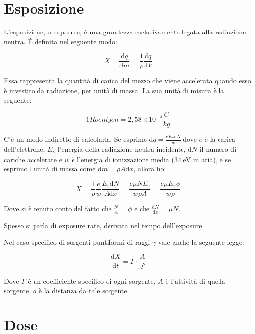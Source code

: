 \documentclass [a4paper, twoside] {book}
\begin{document}
\section{Esposizione}

L'esposizione, o exposure, è una grandezza esclusivamente legata alla radiazione neutra. \'E definita nel seguente modo:

\begin{equation}
X=\frac{\mathrm{d}q}{\mathrm{d}m}=\frac{1}{\rho}\frac{\mathrm{d}q}{\mathrm{d}V}
\end{equation}

Essa rappresenta la quantità di carica del mezzo che viene accelerata quando esso è investito da radiazione, per unità di massa. La sua unità di misura è la seguente:

\begin{equation}
1 Roentgen = 2,58 \times 10^{-4} \frac{C}{kg}
\end{equation}

C'è un modo indiretto di calcolarla. Se esprimo $\mathrm{d}q=\frac{eE_{\gamma}\mathrm{d}N }{w}$ dove $e$ è la carica dell'elettrone, $E_{\gamma}$ l'energia della radiazione neutra incidente, $\mathrm{d}N$ il numero di cariche accelerate e $w$ è l'energia di ionizzazione media (34 eV in aria), e se esprimo l'unità di massa come $\mathrm{d}m=\rho A \mathrm{d}x$, allora ho:

\begin{equation}
X=\frac{1}{\rho}\frac{e}{w}\frac{E_{\gamma}\mathrm{d}N}{A  \mathrm{d}x}=\frac{e  \mu  N E_{\gamma} }{ w  \rho A}=\frac{e \mu E_{\gamma} \phi}{w \rho}
\end{equation}

Dove si è tenuto conto del fatto che $\frac{N}{A}=\phi$ e che $\frac{\mathrm{d}N}{\mathrm{d}x}=\mu N$.

Spesso si parla di exposure rate, derivata nel tempo dell'exposure.

Nel caso specifico di sorgenti puntiformi di raggi $\gamma$ vale anche la seguente legge:

\begin{equation}
\frac{\mathrm{d}X}{\mathrm{d}t}=\Gamma\cdot\frac{A}{d^2}
\end{equation}

Dove $\Gamma$ è un coefficiente specifico di ogni sorgente, $A$ è l'attività di quella sorgente, $d$ è la distanza da tale sorgente.

\section{Dose}
\end{document}
